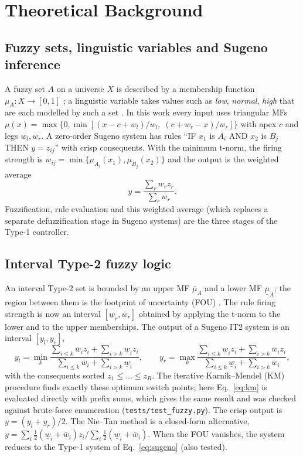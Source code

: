 \section{Theoretical Background}
\subsection{Fuzzy sets, linguistic variables and Sugeno inference}
A fuzzy set $A$ on a universe $X$ is described by a membership function $\mu_A: X\to[0,1]$ \cite{zadeh1965}; a linguistic variable
takes values such as \emph{low}, \emph{normal}, \emph{high} that are each modelled by such a set \cite{zadeh1975}. In this work every
input uses triangular MFs $\mu(x)=\max\{0,\min[(x-c+w_l)/w_l,\;(c+w_r-x)/w_r]\}$ with apex $c$ and legs $w_l,w_r$. A zero-order Sugeno system
\cite{takagi1985} has rules ``IF $x_1$ is $A_i$ AND $x_2$ is $B_j$ THEN $y=z_{ij}$'' with crisp consequents. With the minimum t-norm,
the firing strength is $w_{ij}=\min\{\mu_{A_i}(x_1),\mu_{B_j}(x_2)\}$ and the output is the weighted average
\begin{equation}\label{eq:sugeno}
y=\frac{\sum_{r} w_r z_r}{\sum_{r} w_r}.
\end{equation}
Fuzzification, rule evaluation and this weighted average (which replaces a separate defuzzification stage in Sugeno systems) are the
three stages of the Type-1 controller.

\subsection{Interval Type-2 fuzzy logic}
An interval Type-2 set is bounded by an upper MF $\bar\mu_A$ and a lower MF $\underline\mu_A$; the region between them is the
footprint of uncertainty (FOU) \cite{liang2000,mendel2017}. The rule firing strength is now an interval
$[\underline w_r,\bar w_r]$ obtained by applying the t-norm to the lower and to the upper memberships. The output of a Sugeno IT2 system is
an interval $[y_l,y_r]$,
\begin{equation}\label{eq:km}
y_l=\min_{k}\frac{\sum_{i\le k}\bar w_i z_i+\sum_{i>k}\underline w_i z_i}{\sum_{i\le k}\bar w_i+\sum_{i>k}\underline w_i},\qquad
y_r=\max_{k}\frac{\sum_{i\le k}\underline w_i z_i+\sum_{i>k}\bar w_i z_i}{\sum_{i\le k}\underline w_i+\sum_{i>k}\bar w_i},
\end{equation}
with the consequents sorted $z_1\le\dots\le z_R$. The iterative Karnik--Mendel (KM) procedure \cite{karnik2001} finds exactly these
optimum switch points; here Eq.~\eqref{eq:km} is evaluated directly with prefix sums, which gives the same result and was checked
against brute-force enumeration (\texttt{tests/test\_fuzzy.py}). The crisp output is $y=(y_l+y_r)/2$. The Nie--Tan method \cite{li2018nt}
is a closed-form alternative, $y=\sum_i \tfrac12(\underline w_i+\bar w_i) z_i/\sum_i\tfrac12(\underline w_i+\bar w_i)$. When the FOU vanishes, the system
reduces to the Type-1 system of Eq.~\eqref{eq:sugeno} (also tested).

